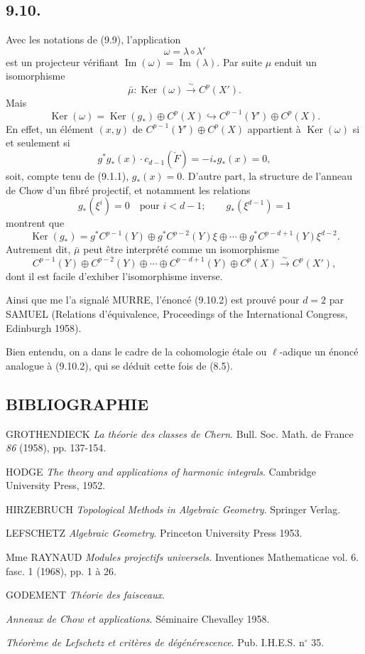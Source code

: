 \documentclass[11pt]{article}
\providecommand{\Ker}{\operatorname{Ker}}
\providecommand{\Ker}{\operatorname{Ker}}
\providecommand{\Ker}{\operatorname{Ker}}
\begin{document}
\subsection*{9.10.}

Avec les notations de (9.9), l'application
\[
\omega=\lambda\circ\lambda'
\]
est un projecteur vérifiant $\operatorname{Im}(\omega)=\operatorname{Im}(\lambda)$. Par suite $\mu$ enduit un isomorphisme
\[
\bar\mu:\Ker(\omega)\xrightarrow{\sim}C^p(X').
\]
Mais
\[
\Ker(\omega)=\Ker(g_*)\oplus C^p(X)\hookrightarrow C^{p-1}(Y')\oplus C^p(X).
\tag{9.10.1}
\]
En effet, un élément $(x,y)$ de $C^{p-1}(Y')\oplus C^p(X)$ appartient à $\Ker(\omega)$ si et seulement si
\[
g^*g_*(x)\cdot c_{d-1}(\check F)=-i_*g_*(x)=0,
\]
soit, compte tenu de (9.1.1), $g_*(x)=0$. D'autre part, la structure de l'anneau de Chow d'un fibré projectif, et notamment les relations
\[
g_*(\xi^i)=0\quad\text{pour }i<d-1;\qquad g_*(\xi^{d-1})=1
\]
montrent que
\[
\Ker(g_*)=g^*C^{p-1}(Y)\oplus g^*C^{p-2}(Y)\xi\oplus\cdots\oplus g^*C^{p-d+1}(Y)\xi^{d-2}.
\]
Autrement dit, $\bar\mu$ peut être interprété comme un isomorphisme
\[
C^{p-1}(Y)\oplus C^{p-2}(Y)\oplus\cdots\oplus C^{p-d+1}(Y)\oplus C^p(X)
\xrightarrow{\sim}C^p(X'),
\tag{9.10.2}
\]
dont il est facile d'exhiber l'isomorphisme inverse.

Ainsi que me l'a signalé MURRE, l'énoncé (9.10.2) est prouvé pour $d=2$ par SAMUEL (Relations d'équivalence, Proceedings of the International Congress, Edinburgh 1958).

Bien entendu, on a dans le cadre de la cohomologie étale ou $\ell$-adique un énoncé analogue à (9.10.2), qui se déduit cette fois de (8.5).

\subsection*{BIBLIOGRAPHIE}

\begin{enumerate}[label={[\arabic*]}]
\item GROTHENDIECK \emph{La théorie des classes de Chern}. Bull. Soc. Math. de France \emph{86} (1958), pp. 137-154.
\item HODGE \emph{The theory and applications of harmonic integrals}. Cambridge University Press, 1952.
\item HIRZEBRUCH \emph{Topological Methods in Algebraic Geometry}. Springer Verlag.
\item LEFSCHETZ \emph{Algebraic Geometry}. Princeton University Press 1953.
\item Mme RAYNAUD \emph{Modules projectifs universels}. Inventiones Mathematicae vol. 6. fasc. 1 (1968), pp. 1 à 26.
\item[{[TF]}] GODEMENT \emph{Théorie des faisceaux}.
\item[{[CH]}] \emph{Anneaux de Chow et applications}. Séminaire Chevalley 1958.
\item[{[6]}] \emph{Théorème de Lefschetz et critères de dégénérescence}. Pub. I.H.E.S. n$^\circ$ 35.
\end{enumerate}
\end{document}
